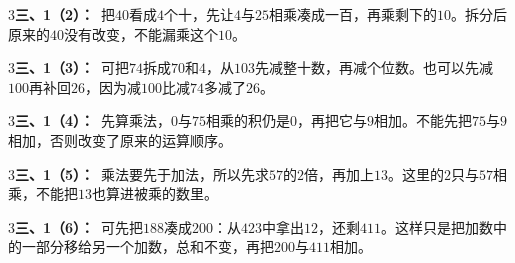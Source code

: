 \documentclass[multi=snippet,border={5bp 20bp 5bp 5bp}]{standalone}
\newenvironment{snippet}[3]{\begin{minipage}{#1bp}\color{answerred}\fontsize{#2}{#3}\selectfont\raggedright}{\end{minipage}}
\begin{document}
\begin{snippet}{505}{11.5}{14}\begin{multicols}{3}\raggedcolumns \textbf{三、1（2）：}\ 把\(40\)\allowbreak 看成\(4\)\allowbreak 个十，先让\(4\)\allowbreak 与\(25\)\allowbreak 相乘凑成一百，再乘剩下的\(10\)\allowbreak 。拆分后原来的\(40\)\allowbreak 没有改变，不能漏乘这个\(10\)\allowbreak 。\end{multicols}\end{snippet}
\begin{snippet}{505}{11.5}{14}\begin{multicols}{3}\raggedcolumns \textbf{三、1（3）：}\ 可把\(74\)\allowbreak 拆成\(70\)\allowbreak 和\(4\)\allowbreak ，从\(103\)\allowbreak 先减整十数，再减个位数。也可以先减\(100\)\allowbreak 再补回\(26\)\allowbreak ，因为减\(100\)\allowbreak 比减\(74\)\allowbreak 多减了\(26\)\allowbreak 。\end{multicols}\end{snippet}
\begin{snippet}{505}{11.5}{14}\begin{multicols}{3}\raggedcolumns \textbf{三、1（4）：}\ 先算乘法，\(0\)\allowbreak 与\(75\)\allowbreak 相乘的积仍是\(0\)\allowbreak ，再把它与\(9\)\allowbreak 相加。不能先把\(75\)\allowbreak 与\(9\)\allowbreak 相加，否则改变了原来的运算顺序。\end{multicols}\end{snippet}
\begin{snippet}{505}{11.5}{14}\begin{multicols}{3}\raggedcolumns \textbf{三、1（5）：}\ 乘法要先于加法，所以先求\(57\)\allowbreak 的\(2\)\allowbreak 倍，再加上\(13\)\allowbreak 。这里的\(2\)\allowbreak 只与\(57\)\allowbreak 相乘，不能把\(13\)\allowbreak 也算进被乘的数里。\end{multicols}\end{snippet}
\begin{snippet}{505}{11.5}{14}\begin{multicols}{3}\raggedcolumns \textbf{三、1（6）：}\ 可先把\(188\)\allowbreak 凑成\(200\)\allowbreak ：从\(423\)\allowbreak 中拿出\(12\)\allowbreak ，还剩\(411\)\allowbreak 。这样只是把加数中的一部分移给另一个加数，总和不变，再把\(200\)\allowbreak 与\(411\)\allowbreak 相加。\end{multicols}\end{snippet}
\end{document}
